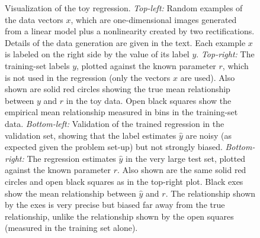 \documentclass[11pt]{article}
\begin{document}
\begin{figure}[p!]
\caption{\sffamily%
Visualization of the toy regression. \textsl{Top-left:} Random examples of the data vectors $x$, which are one-dimensional images generated from a linear model plus a nonlinearity created by two rectifications. Details of the data generation are given in the text. Each example $x$ is labeled on the right side by the value of its label $y$. \textsl{Top-right:} The training-set labels $y$, plotted against the known parameter $r$, which is not used in the regression (only the vectors $x$ are used). Also shown are solid red circles showing the true mean relationship between $y$ and $r$ in the toy data. Open black squares show the empirical mean relationship measured in bins in the training-set data. \textsl{Bottom-left:} Validation of the trained regression in the validation set, showing that the label estimates $\hat{y}$ are noisy (as expected given the problem set-up) but not strongly biased. \textsl{Bottom-right:} The regression estimates $\hat{y}$ in the very large test set, plotted against the known parameter $r$. Also shown are the same solid red circles and open black squares as in the top-right plot. Black exes show the mean relationship between $\hat{y}$ and $r$. The relationship shown by the exes is very precise but biased far away from the true relationship, unlike the relationship shown by the open squares (measured in the training set alone).\label{fig:regression}}
\end{figure}
\end{document}
